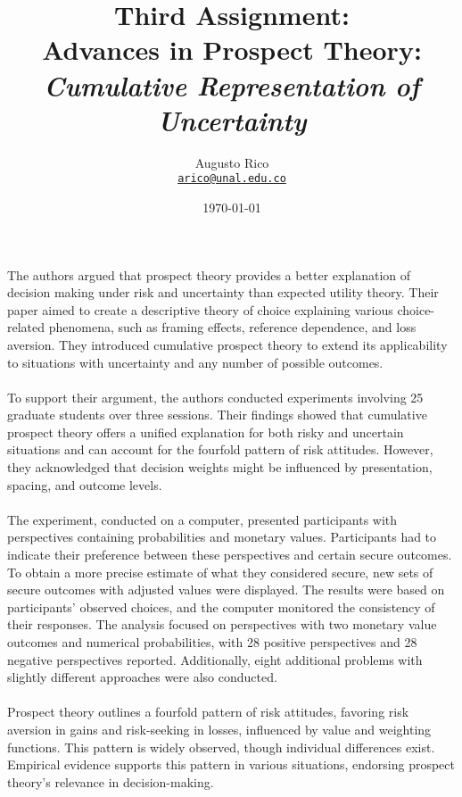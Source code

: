 \documentclass[11pt]{article}
\title{Third Assignment: \\ \textbf{Advances in Prospect Theory:} \\ \textbf{\textit{Cumulative Representation of Uncertainty}}}
\author{Augusto Rico\\%
    \href{mailto:arico@unal.edu.co}{\texttt{arico@unal.edu.co}}
    }
\date{\today}
\begin{document}
\maketitle


\begin{flushleft}
    The authors argued that prospect theory provides a better explanation of decision making under risk and uncertainty than expected utility theory. Their paper aimed to create a descriptive theory of choice explaining various choice-related phenomena, such as framing effects, reference dependence, and loss aversion. They introduced cumulative prospect theory to extend its applicability to situations with uncertainty and any number of possible outcomes.\\~\\

    To support their argument, the authors conducted experiments involving 25 graduate students over three sessions. Their findings showed that cumulative prospect theory offers a unified explanation for both risky and uncertain situations and can account for the fourfold pattern of risk attitudes. However, they acknowledged that decision weights might be influenced by presentation, spacing, and outcome levels.\\~\\
    
    The experiment, conducted on a computer, presented participants with perspectives containing probabilities and monetary values. Participants had to indicate their preference between these perspectives and certain secure outcomes. To obtain a more precise estimate of what they considered secure, new sets of secure outcomes with adjusted values were displayed. The results were based on participants' observed choices, and the computer monitored the consistency of their responses. The analysis focused on perspectives with two monetary value outcomes and numerical probabilities, with 28 positive perspectives and 28 negative perspectives reported. Additionally, eight additional problems with slightly different approaches were also conducted.\\~\\
    
    Prospect theory outlines a fourfold pattern of risk attitudes, favoring risk aversion in gains and risk-seeking in losses, influenced by value and weighting functions. This pattern is widely observed, though individual differences exist. Empirical evidence supports this pattern in various situations, endorsing prospect theory's relevance in decision-making.\\~\\
    

\end{flushleft}
\end{document}
